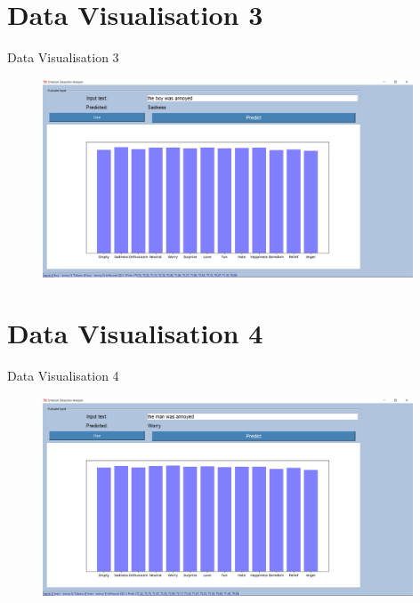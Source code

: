 \documentclass{beamer}
\begin{document}
\section{Data Visualisation 3}
\begin{frame}{Data Visualisation 3}
\begin{figure}[H]
\centering
\includegraphics[width=110mm]{DV3.png}
\end{figure}
\end{frame}

\section{Data Visualisation 4}
\begin{frame}{Data Visualisation 4}
\begin{figure}[H]
\centering
\includegraphics[width=110mm]{DV4.png}
\end{figure}
\end{frame}
\end{document}
